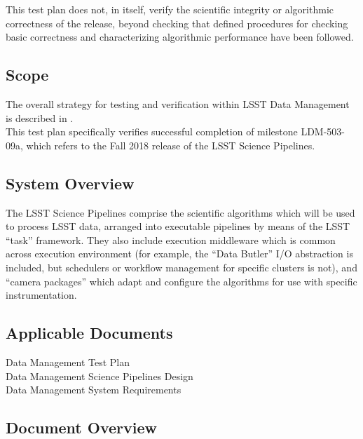 \documentclass[DM,lsstdraft,STR,toc]{lsstdoc}
\begin{document}
This test plan does not, in itself, verify the scientific integrity or
algorithmic correctness of the release, beyond checking that defined
procedures for checking basic correctness and characterizing algorithmic
performance have been followed.\\[2\baselineskip]

\subsection{Scope}\label{scope}

The overall strategy for testing and verification within LSST Data
Management is described in .\\
This test plan specifically verifies successful completion of milestone
LDM-503-09a, which refers to the Fall 2018 release of the LSST Science
Pipelines.



\subsection{System Overview}
\label{sect:systemoverview}

The LSST Science Pipelines comprise the scientific algorithms which will
be used to process LSST data, arranged into executable pipelines by
means of the LSST ``task'' framework. They also include execution
middleware which is common across execution environment (for example,
the ``Data Butler'' I/O abstraction is included, but schedulers or
workflow management for specific clusters is not), and ``camera
packages'' which adapt and configure the algorithms for use with
specific instrumentation.\\[2\baselineskip]

\subsection{\texorpdfstring{Applicable Documents\\
}{Applicable Documents }}\label{applicable-documents}

 Data Management Test Plan\\
 Data Management Science Pipelines Design\\
 Data Management System Requirements


\subsection{Document Overview}
\label{sect:docoverview}
\end{document}
